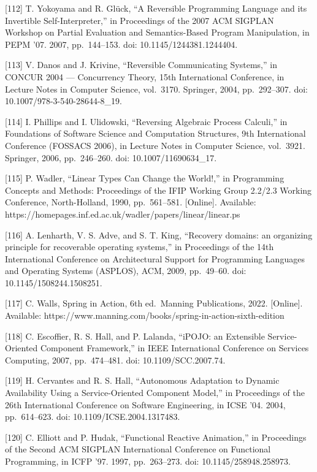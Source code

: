 \documentclass[
  10
]{article}
\begin{document}
{[}112{]} T. Yokoyama and R. Glück, ``A Reversible Programming Language and its
Invertible Self-Interpreter,'' in Proceedings of the 2007 ACM SIGPLAN Workshop on
Partial Evaluation and Semantics-Based Program Manipulation, in PEPM '07. 2007,
pp.~144--153. doi: 10.1145/1244381.1244404.

{[}113{]} V. Danos and J. Krivine, ``Reversible Communicating Systems,'' in CONCUR
2004 --- Concurrency Theory, 15th International Conference, in Lecture Notes in
Computer Science, vol.~3170. Springer, 2004, pp.~292--307. doi:
10.1007/978-3-540-28644-8\_19.

{[}114{]} I. Phillips and I. Ulidowski, ``Reversing Algebraic Process Calculi,'' in
Foundations of Software Science and Computation Structures, 9th International
Conference (FOSSACS 2006), in Lecture Notes in Computer Science, vol.~3921.
Springer, 2006, pp.~246--260. doi: 10.1007/11690634\_17.

{[}115{]} P. Wadler, ``Linear Types Can Change the World!,'' in Programming
Concepts and Methods: Proceedings of the IFIP Working Group 2.2/2.3 Working
Conference, North-Holland, 1990, pp.~561--581. {[}Online{]}. Available:
https://homepages.inf.ed.ac.uk/wadler/papers/linear/linear.ps

{[}116{]} A. Lenharth, V. S. Adve, and S. T. King, ``Recovery domains: an
organizing principle for recoverable operating systems,'' in Proceedings of the 14th
International Conference on Architectural Support for Programming Languages and
Operating Systems (ASPLOS), ACM, 2009, pp.~49--60. doi: 10.1145/1508244.1508251.

{[}117{]} C. Walls, Spring in Action, 6th ed.~Manning Publications, 2022. {[}Online{]}.
Available: https://www.manning.com/books/spring-in-action-sixth-edition

{[}118{]} C. Escoffier, R. S. Hall, and P. Lalanda, ``iPOJO: an Extensible
Service-Oriented Component Framework,'' in IEEE International Conference on
Services Computing, 2007, pp.~474--481. doi: 10.1109/SCC.2007.74.

{[}119{]} H. Cervantes and R. S. Hall, ``Autonomous Adaptation to Dynamic
Availability Using a Service-Oriented Component Model,'' in Proceedings of the 26th
International Conference on Software Engineering, in ICSE '04. 2004, pp.~614--623.
doi: 10.1109/ICSE.2004.1317483.

{[}120{]} C. Elliott and P. Hudak, ``Functional Reactive Animation,'' in Proceedings
of the Second ACM SIGPLAN International Conference on Functional Programming, in
ICFP '97. 1997, pp.~263--273. doi: 10.1145/258948.258973.
\end{document}
